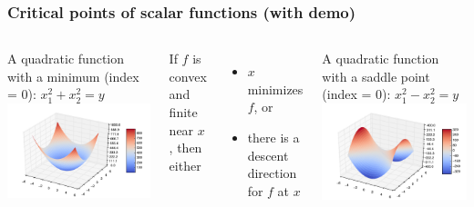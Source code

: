 \documentclass{beamer}
\begin{document}

\begin{frame}
\frametitle{Critical points of scalar functions (with demo)}

\begin{columns}

A quadratic function with a minimum (index = 0): $x_1^2 + x_2^2 = y$
\includegraphics[scale = 0.34]{figures/localmin.pdf}

If $f$ is convex and finite near $x$, then either
\begin{itemize}
\item $x$ minimizes $f$, or
\item there is a descent direction for $f$ at $x$
\end{itemize}

A quadratic function with a saddle point (index = 0): $x_1^2 - x_2^2 = y$
\includegraphics[scale = 0.34]{figures/saddle.pdf}


\end{columns}
\end{frame}
\end{document}
